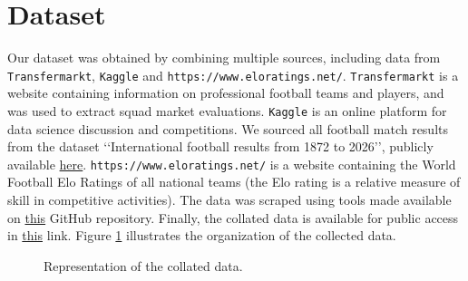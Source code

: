 \documentclass[12pt,paper=letter,leqno]{scrartcl}
\begin{document}
\section{Dataset}
Our dataset was obtained by combining multiple sources, including data from \texttt{Transfermarkt}, \texttt{Kaggle} and \texttt{https://www.eloratings.net/}. \texttt{Transfermarkt} is a website containing information on professional football teams and players, and was used to extract squad market evaluations. \texttt{Kaggle} is an online platform for data science discussion and competitions. We sourced all football match results from the dataset \lq\lq International football results from 1872 to 2026\rq\rq, publicly available \href{https://www.kaggle.com/datasets/martj42/international-football-results-from-1872-to-2017}{here}. \texttt{https://www.eloratings.net/} is a website containing the World Football Elo Ratings of all national teams (the Elo rating is a relative measure of skill in competitive activities). The data was scraped using tools made available on \href{https://github.com/JGravier/soccer-elo}{this} GitHub repository. Finally, the collated data is available for public access in \href{https://github.com/brunotancredi/Random-Football-Expert}{this} link. Figure \ref{fig:organization} illustrates the organization of the collected data.

\begin{figure}
    \centering
    \caption{Representation of the collated data.}
    \label{fig:organization}
\end{figure}
\end{document}
